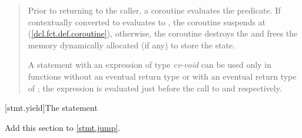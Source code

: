 \begin{quote}

\pnum
Prior to returning to the caller, a coroutine evaluates
the  predicate. If  contextually converted to  evaluates to
, the coroutine suspends at  (\ref{dcl.fct.def.coroutine}),
otherwise, the coroutine destroys the  and frees the memory dynamically allocated (if any) to store the state.

\pnum
A  statement with an expression of type \textit{cv-void}
can be used only in functions without an eventual return type 
or with an eventual return type of ; the expression is evaluated just before the call to  and  respectively.


%

\end{quote}

[stmt.yield]{The  statement}%

Add this section to \ref{stmt.jump}.

